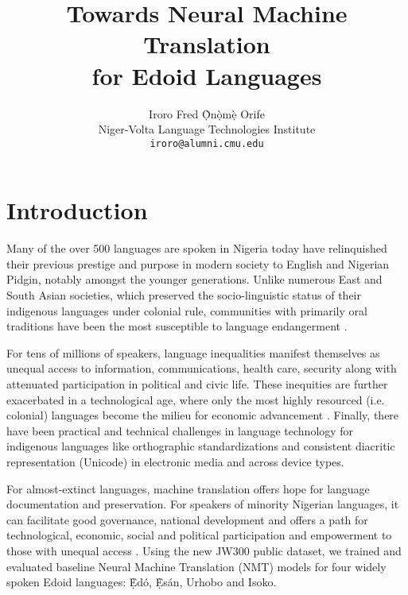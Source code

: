 \documentclass{article} %
\title{Towards Neural Machine Translation \\ for Edoid Languages}
\author{Iroro Fred \d{\`O}n\d{\`o}m\d{\`e} Orife \\
Niger-Volta Language Technologies Institute\\
\texttt{iroro@alumni.cmu.edu} \\
}
\begin{document}
\maketitle



\section{Introduction}

Many of the over 500 languages are spoken in Nigeria today have relinquished their previous prestige and purpose in modern society to English and Nigerian Pidgin, notably amongst the younger generations. Unlike numerous East and South Asian societies, which preserved the socio-linguistic status of their indigenous languages under colonial rule, communities with primarily oral traditions have been the most susceptible to language endangerment \citep{rolle2013phonetics, omo2004esan}.

For tens of millions of speakers, language inequalities manifest themselves as unequal access to information, communications, health care, security along with attenuated participation in political and civic life. These inequities are further exacerbated in a technological age, where only the most highly resourced (i.e. colonial) languages become the milieu for economic advancement \citep{odojelanguage, awobuluyi201626, ganagana2019contrastive}. Finally, there have been practical and technical challenges in language technology for indigenous languages like orthographic standardizations and consistent diacritic representation (Unicode) in electronic media and across device types. 

For almost-extinct languages, machine translation offers hope for language documentation and preservation. For speakers of minority Nigerian languages, it can facilitate good governance, national development and offers a path for technological, economic, social and political participation and empowerment to those with unequal access \citep{odoje201612, odojelanguage}. Using the new JW300 public dataset, we trained and evaluated baseline Neural Machine Translation (NMT) models for four widely spoken Edoid languages: \d{\`E}d{\'o}, \d{\`E}s{\'a}n, Urhobo and Isoko. 
\end{document}
